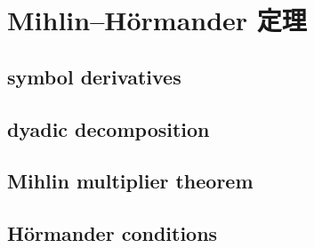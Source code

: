 \section{Mihlin–Hörmander 定理}
\label{b2:sec:2202}


\subsection{symbol derivatives}
\label{b2:subsec:220201}

\subsection{dyadic decomposition}
\label{b2:subsec:220202}

\subsection{Mihlin multiplier theorem}
\label{b2:subsec:220203}

\subsection{Hörmander conditions}
\label{b2:subsec:220204}


